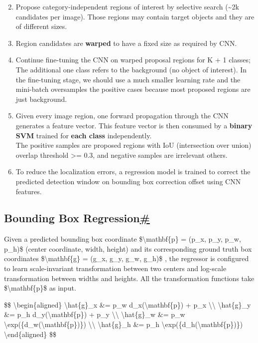 \begin{enumerate}
\setcounter{enumi}{1}
\tightlist
\item
  Propose category-independent regions of interest by selective search (\textasciitilde2k candidates per image). Those regions may contain target objects and they are of different sizes.
\item
  Region candidates are \textbf{warped} to have a fixed size as required by CNN.
\item
  Continue fine-tuning the CNN on warped proposal regions for K + 1 classes; The additional one class refers to the background (no object of interest). In the fine-tuning stage, we should use a much smaller learning rate and the mini-batch oversamples the positive cases because most proposed regions are just background.
\item
  Given every image region, one forward propagation through the CNN generates a feature vector. This feature vector is then consumed by a \textbf{binary SVM} trained for \textbf{each class} independently.\\
  The positive samples are proposed regions with IoU (intersection over union) overlap threshold \textgreater= 0.3, and negative samples are irrelevant others.
\item
  To reduce the localization errors, a regression model is trained to correct the predicted detection window on bounding box correction offset using CNN features.
\end{enumerate}

\subsection{\texorpdfstring{Bounding Box Regression\hyperref[bounding-box-regression]{\#}}{Bounding Box Regression\#}}\label{bounding-box-regression}

Given a predicted bounding box coordinate \$\textbackslash mathbf\{p\} = (p\_x, p\_y, p\_w, p\_h)\$ (center coordinate, width, height) and its corresponding ground truth box coordinates \$\textbackslash mathbf\{g\} = (g\_x, g\_y, g\_w, g\_h)\$ , the regressor is configured to learn scale-invariant transformation between two centers and log-scale transformation between widths and heights. All the transformation functions take \$\textbackslash mathbf\{p\}\$ as input.

\$\$ \textbackslash begin\{aligned\} \textbackslash hat\{g\}\_x \&= p\_w d\_x(\textbackslash mathbf\{p\}) + p\_x \textbackslash\textbackslash{} \textbackslash hat\{g\}\_y \&= p\_h d\_y(\textbackslash mathbf\{p\}) + p\_y \textbackslash\textbackslash{} \textbackslash hat\{g\}\_w \&= p\_w \textbackslash exp(\{d\_w(\textbackslash mathbf\{p\})\}) \textbackslash\textbackslash{} \textbackslash hat\{g\}\_h \&= p\_h \textbackslash exp(\{d\_h(\textbackslash mathbf\{p\})\}) \textbackslash end\{aligned\} \$\$

